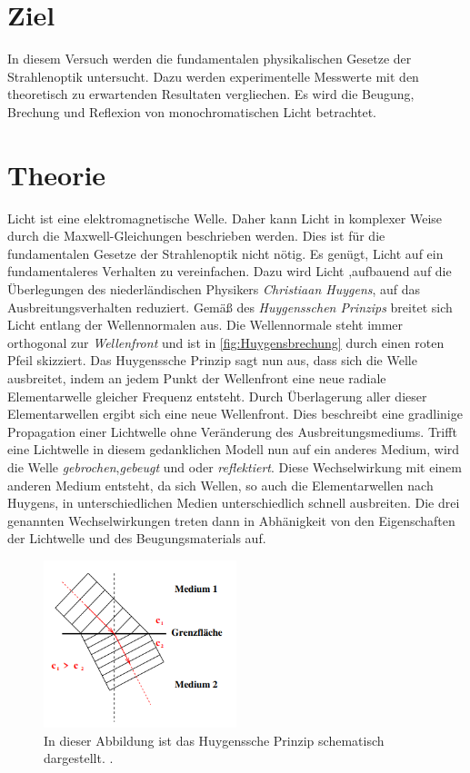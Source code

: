 \section{Ziel}
\label{sec:Ziel}
In diesem Versuch werden die fundamentalen physikalischen Gesetze der Strahlenoptik untersucht. Dazu werden experimentelle Messwerte mit den theoretisch zu erwartenden
Resultaten vergliechen. Es wird die Beugung, Brechung und Reflexion von monochromatischen Licht betrachtet.
\section{Theorie}
\label{sec:Theorie}
Licht ist eine elektromagnetische Welle. Daher kann Licht in komplexer Weise durch die Maxwell-Gleichungen beschrieben werden. Dies ist für die fundamentalen Gesetze der
Strahlenoptik nicht nötig. Es genügt, Licht auf ein fundamentaleres Verhalten zu vereinfachen. Dazu wird Licht ,aufbauend auf die Überlegungen des niederländischen Physikers 
\textit{Christiaan Huygens}, auf das Ausbreitungsverhalten reduziert. Gemäß des \textit{Huygensschen Prinzips} breitet sich Licht entlang der Wellennormalen aus. Die 
Wellennormale steht immer orthogonal zur \textit{Wellenfront} und ist in \autoref{fig:Huygensbrechung} durch einen roten Pfeil skizziert. Das Huygenssche Prinzip sagt nun aus,
dass sich die Welle ausbreitet, indem an jedem Punkt der Wellenfront eine neue radiale Elementarwelle gleicher Frequenz entsteht. Durch Überlagerung aller dieser Elementarwellen 
ergibt sich eine neue Wellenfront. Dies beschreibt eine gradlinige Propagation einer Lichtwelle ohne Veränderung des Ausbreitungsmediums. Trifft eine Lichtwelle in diesem 
gedanklichen Modell nun auf ein anderes Medium, wird die Welle \textit{gebrochen},\textit{gebeugt} und oder \textit{reflektiert}. Diese Wechselwirkung mit einem
anderen Medium entsteht, da sich Wellen, so auch die Elementarwellen nach Huygens, in unterschiedlichen Medien unterschiedlich schnell ausbreiten. Die drei genannten 
Wechselwirkungen treten dann in Abhänigkeit von den Eigenschaften der Lichtwelle und des Beugungsmaterials auf. 

\begin{figure}
    \centering
    \includegraphics[width=0.5\textwidth]{content/HuygensscheBrechung.png}
    \caption{In dieser Abbildung ist das Huygenssche Prinzip schematisch dargestellt. \cite{v400}.}
    \label{fig:Huygensbrechung}
\end{figure}

